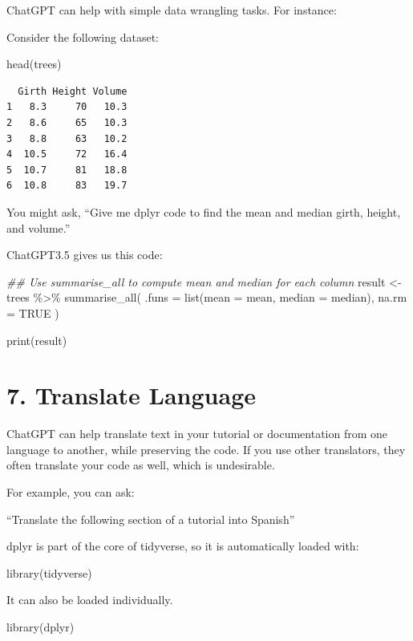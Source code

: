 \documentclass[
  letterpaper,
  DIV=11,
  numbers=noendperiod]{scrreprt}
\newenvironment{Shaded}{\begin{snugshade}}{\end{snugshade}}
\newcommand{\AttributeTok}[1]{\textcolor[rgb]{0.40,0.45,0.13}{#1}}
\newcommand{\ConstantTok}[1]{\textcolor[rgb]{0.56,0.35,0.01}{#1}}
\newcommand{\DocumentationTok}[1]{\textcolor[rgb]{0.37,0.37,0.37}{\textit{#1}}}
\newcommand{\FunctionTok}[1]{\textcolor[rgb]{0.28,0.35,0.67}{#1}}
\newcommand{\NormalTok}[1]{\textcolor[rgb]{0.00,0.23,0.31}{#1}}
\newcommand{\OtherTok}[1]{\textcolor[rgb]{0.00,0.23,0.31}{#1}}
\newcommand{\SpecialCharTok}[1]{\textcolor[rgb]{0.37,0.37,0.37}{#1}}
\begin{document}
ChatGPT can help with simple data wrangling tasks. For instance:

Consider the following dataset:

\begin{Shaded}
\begin{Highlighting}[]
\FunctionTok{head}\NormalTok{(trees)}
\end{Highlighting}
\end{Shaded}

\begin{verbatim}
  Girth Height Volume
1   8.3     70   10.3
2   8.6     65   10.3
3   8.8     63   10.2
4  10.5     72   16.4
5  10.7     81   18.8
6  10.8     83   19.7
\end{verbatim}

You might ask, ``Give me dplyr code to find the mean and median girth,
height, and volume.''

ChatGPT3.5 gives us this code:

\label{chatgpt}
\begin{Shaded}
\begin{Highlighting}[]
\DocumentationTok{\#\# Use summarise\_all to compute mean and median for each column}
\NormalTok{result }\OtherTok{\textless{}{-}}\NormalTok{ trees }\SpecialCharTok{\%\textgreater{}\%}
  \FunctionTok{summarise\_all}\NormalTok{(}
    \AttributeTok{.funs =} \FunctionTok{list}\NormalTok{(}\AttributeTok{mean =}\NormalTok{ mean, }\AttributeTok{median =}\NormalTok{ median),}
    \AttributeTok{na.rm =} \ConstantTok{TRUE}
\NormalTok{  )}

\FunctionTok{print}\NormalTok{(result)}
\end{Highlighting}
\end{Shaded}

\section{7. Translate Language}\label{translate-language}

ChatGPT can help translate text in your tutorial or documentation from
one language to another, while preserving the code. If you use other
translators, they often translate your code as well, which is
undesirable.

For example, you can ask:

``Translate the following section of a tutorial into Spanish''

\begin{Shaded}
\begin{Highlighting}[]
\NormalTok{dplyr is part of the core of tidyverse, so it is automatically loaded with}\SpecialCharTok{:}

\FunctionTok{library}\NormalTok{(tidyverse)}

\NormalTok{It can also be loaded individually.}

\FunctionTok{library}\NormalTok{(dplyr)}
\end{Highlighting}
\end{Shaded}
\end{document}
